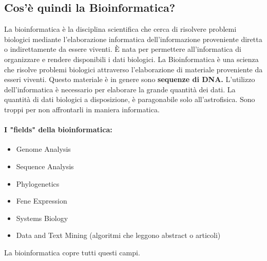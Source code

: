 \documentclass{article}
\begin{document}
\subsection{Cos'è quindi la Bioinformatica?}
La bioinformatica è la disciplina scientifica che cerca di risolvere problemi biologici mediante l'elaborazione informatica dell'informazione proveniente diretta o indirettamente da essere viventi. È nata per permettere all'informatica di organizzare e rendere disponibili i dati biologici.
La Bioinformatica è una scienza che risolve problemi biologici attraverso l'elaborazione di materiale proveniente da esseri viventi. Questo materiale è in genere sono \textbf{sequenze di DNA.} L'utilizzo dell'informatica è necessario per elaborare la grande quantità dei dati.
La quantità di dati biologici a disposizione, è paragonabile solo all'astrofisica. Sono troppi per non affrontarli in maniera informatica.\\
\paragraph{I "fields" della bioinformatica:}
\begin{itemize}
    \item Genome Analysis
    \item Sequence Analysis
    \item Phylogenetics
    \item Fene Expression
    \item Systems Biology
    \item Data and Text Mining (algoritmi che leggono abstract o articoli)
\end{itemize}
La bioinformatica copre tutti questi campi.
\end{document}
